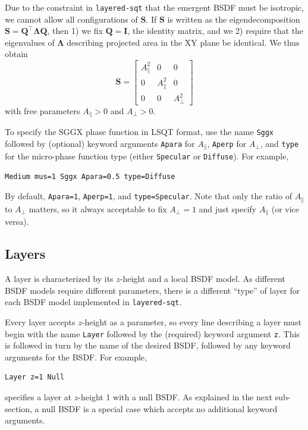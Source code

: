 \documentclass[
    twoside,
    twocolumn,
    letterpaper,
    10pt]{article}
\newcommand\namett[2]{{\color{code#1}\texttt{#2}}}
\begin{document}
Due to the constraint in \texttt{layered-sqt} that the emergent BSDF must be
isotropic, we cannot allow all configurations of $\mathbf{S}$. If $\mathbf{S}$
is written as the eigendecomposition
$\mathbf{S} = \mathbf{Q}^\top \mathbf{\Lambda} \mathbf{Q}$,
then 1) we fix $\mathbf{Q} = \mathbf{I}$, the identity matrix, and we 2) require
that the eigenvalues of $\mathbf{\Lambda}$ describing projected area in the
XY plane be identical. We thus obtain
\begin{equation*}
    \mathbf{S} = \begin{bmatrix}
        A_{\parallel}^2 & 0 & 0 \\
        0 & A_{\parallel}^2 & 0 \\
        0 & 0 & A_{\perp}^2 
    \end{bmatrix}
\end{equation*}
with free parameters $A_{\parallel} > 0$ and $A_{\perp} > 0$.

To specify the SGGX phase function in LSQT format, use the name
\namett{purple}{Sggx} followed by (optional) keyword arguments
\texttt{Apara} for $A_{\parallel}$, \texttt{Aperp} for $A_{\perp}$, and
\texttt{type} for the micro-phase function type (either \texttt{Specular} 
or \texttt{Diffuse}). For example,
\begin{lstlisting}
Medium mus=1 Sggx Apara=0.5 type=Diffuse
\end{lstlisting}
By default, \texttt{Apara=1}, \texttt{Aperp=1}, and 
\texttt{type=Specular}. Note that only the ratio of
$A_{\parallel}$ to $A_{\perp}$ matters, so it always acceptable to fix
$A_{\perp} = 1$ and just specify $A_{\parallel}$ (or vice versa).

\subsection{Layers}
\label{sec:doc-layers}

A layer is characterized by its $z$-height and 
a local BSDF model. As different BSDF models require different 
parameters, there is a different ``type'' of layer for each 
BSDF model implemented in \texttt{layered-sqt}. 

Every layer accepts $z$-height as a parameter, so every line describing a 
layer must begin with the name \namett{blue}{Layer} followed by the (required)
keyword argument \texttt{z}. This is followed in turn by the name of the 
desired BSDF, followed by any keyword arguments for the BSDF. For example,
\begin{lstlisting}
Layer z=1 Null
\end{lstlisting}
specifies a layer at $z$-height 1 with a null BSDF. As explained in 
the next sub-section, a null BSDF is a special case which accepts no additional
keyword arguments.
\end{document}
